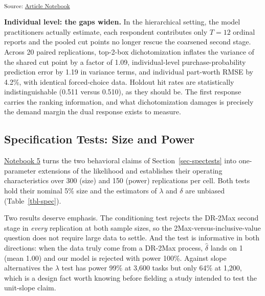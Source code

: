 \documentclass[
  letterpaper,
  DIV=11,
  numbers=noendperiod]{scrartcl}
\theoremstyle{plain}
\theoremstyle{plain}
\theoremstyle{remark}
\begin{document}
\textsubscript{Source:
\href{https://dyavorsky.github.io/ordinalDualresponse_paper/index.qmd.html}{Article
Notebook}}

\textbf{Individual level: the gaps widen.} In the hierarchical setting,
the model practitioners actually estimate, each respondent contributes
only \(T = 12\) ordinal reports and the pooled cut points no longer
rescue the coarsened second stage. Across 20 paired replications,
top-2-box dichotomization inflates the variance of the shared cut point
by a factor of 1.09, individual-level purchase-probability prediction
error by 1.19 in variance terms, and individual part-worth RMSE by
4.2\%, with identical forced-choice data. Holdout hit rates are
statistically indistinguishable (0.511 versus 0.510), as they should be.
The first response carries the ranking information, and what
dichotomization damages is precisely the demand margin the dual response
exists to measure.

\subsection{Specification Tests: Size and
Power}\label{sec-sim-spectests}

\href{notebooks/05-specification-tests.qmd}{Notebook 5} turns the two
behavioral claims of Section~\ref{sec-spectests} into one-parameter
extensions of the likelihood and establishes their operating
characteristics over 300 (size) and 150 (power) replications per cell.
Both tests hold their nominal 5\% size and the estimators of \(\lambda\)
and \(\delta\) are unbiased (Table~\ref{tbl-spec}).

Two results deserve emphasis. The conditioning test rejects the DR-2Max
second stage in \emph{every} replication at both sample sizes, so the
2Max-versus-inclusive-value question does not require large data to
settle. And the test is informative in both directions: when the data
truly come from a DR-2Max process, \(\hat\delta\) lands on 1 (mean 1.00)
and our model is rejected with power 100\%. Against slope alternatives
the \(\lambda\) test has power 99\% at 3,600 tasks but only 64\% at
1,200, which is a design fact worth knowing before fielding a study
intended to test the unit-slope claim.
\end{document}
